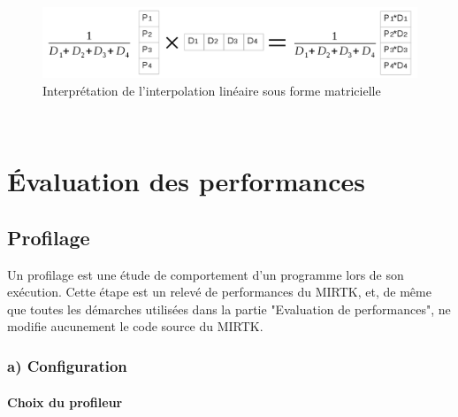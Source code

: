\documentclass[10pt]{report}
\begin{document}
	\begin{figure}[h!]
		\begin{center}
			\includegraphics[width=16cm]{calcul_interp_lineaire.png}	
		\end{center}
		\caption{Interprétation de l'interpolation linéaire sous forme matricielle}
		\label{Interprétation de l'interpolation linéaire sous forme matricielle}
	\end{figure}
	~\par 

	

	\section{Évaluation des performances}
		\subsection{Profilage}
%	
Un profilage est une étude de comportement d'un programme lors de son exécution. Cette étape est un relevé de performances du MIRTK, et, de même que toutes les démarches utilisées dans la partie "Evaluation de performances", ne modifie aucunement le code source du MIRTK. 

		\subsubsection{a) Configuration}
			\paragraph{Choix du profileur}~\par
\end{document}
